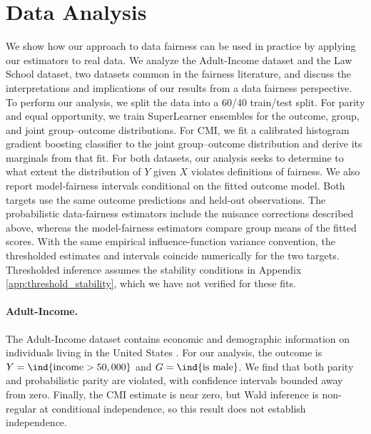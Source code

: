 \section{Data Analysis}
\label{sec:data}

We show how our approach to data fairness can be used in practice by applying our estimators to real data.
We analyze the Adult-Income dataset and the Law School dataset, two datasets common in the fairness literature, and discuss the interpretations and implications of our results from a data fairness perspective.
To perform our analysis, we split the data into a 60/40 train/test split. For parity and equal opportunity, we train SuperLearner ensembles \cite{laanSuperLearner2007} for the outcome, group, and joint group--outcome distributions. For CMI, we fit a calibrated histogram gradient boosting classifier to the joint group--outcome distribution and derive its marginals from that fit.
For both datasets, our analysis seeks to determine to what extent the distribution of $Y$ given $X$ violates definitions of fairness.
We also report model-fairness intervals conditional on the fitted outcome model. Both targets use the same outcome predictions and held-out observations. The probabilistic data-fairness estimators include the nuisance corrections described above, whereas the model-fairness estimators compare group means of the fitted scores. With the same empirical influence-function variance convention, the thresholded estimates and intervals coincide numerically for the two targets.
Thresholded inference assumes the stability conditions in Appendix \ref{app:threshold_stability}, which we have not verified for these fits.

\begin{table}
  \centering
  
  \caption{Data- and model-fairness estimates with nominal $95\%$ confidence intervals in parentheses. Parity and equal-opportunity comparisons share the fitted outcome model and evaluation split. CMI is reported only for data fairness; its intervals near zero should be interpreted with caution (Section \ref{sec:cmi}).}
  \label{tab:data_results}
\end{table}

\paragraph{Adult-Income.}
The Adult-Income dataset contains economic and demographic information on individuals living in the United States \cite{dingRetiringAdultNew2021} \cite{floodIntegratedPublicUse2020}.
For our analysis, the outcome is $Y = \ind\{\text{income} > 50,000\}$ and $G = \ind\{\text{is male}\}$.
We find that both parity and probabilistic parity are violated, with confidence intervals bounded away from zero.
Finally, the CMI estimate is near zero, but Wald inference is non-regular at conditional independence, so this result does not establish independence.

